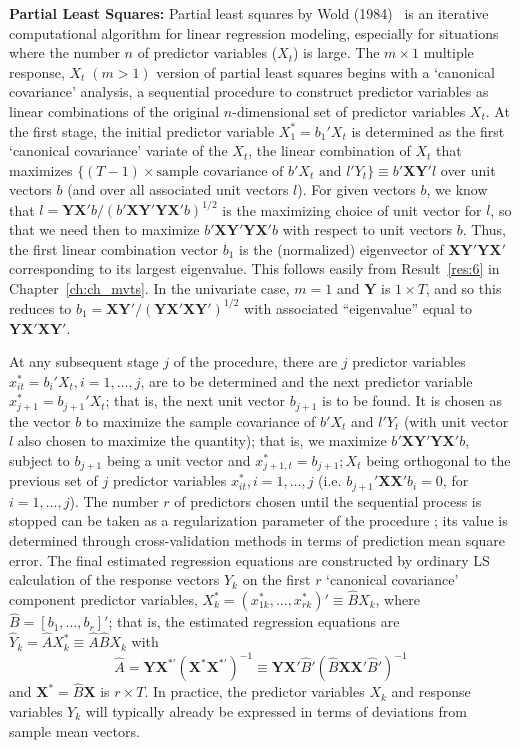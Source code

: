 \noindent\textbf{Partial Least Squares:} Partial least squares by Wold (1984)~\cite{wold} is an iterative computational algorithm for linear regression modeling, especially for situations where the number $n$ of predictor variables ($X_t$) is large. The $m \times 1$ multiple response, $X_t \;(m>1)$ version of partial least squares begins with a `canonical covariance' analysis, a sequential procedure to construct predictor variables as linear combinations of the original $n$-dimensional set of predictor variables $X_t$. At the first stage, the initial predictor variable $X_{1}^*=b_1'X_t$ is determined as the first `canonical covariance' variate of the $X_t$, the linear combination of $X_t$ that maximizes $\{(T - 1) \times \text{sample covariance of } b'X_t \text{ and } l'Y_t \} \equiv b' \mathbf{XY}' l$ over unit vectors $b$ (and over all associated unit vectors $l$). For given vectors $b$, we know that $l=\mathbf{YX'} b/(b' \mathbf{XY'YX'}b)^{1/2}$ is the maximizing choice of unit vector for $l$, so that we need then to maximize $b' \mathbf{XY'YX'}b$ with respect to unit vectors $b$. Thus, the first linear combination vector $b_1$ is the (normalized) eigenvector of $\mathbf{XY'YX'}$ corresponding to its largest eigenvalue. This follows easily from Result~\ref{res:6} in Chapter~\ref{ch:ch_mvts}. In the univariate case, $m=1$ and $\mathbf{Y}$ is $1 \times T$, and so this reduces to $b_1=\mathbf{XY'}/(\mathbf{YX'XY'})^{1/2}$ with associated ``eigenvalue'' equal to $\mathbf{YX'XY'}$.


At any subsequent stage $j$ of the procedure, there are $j$ predictor variables $x_{it}^*= b_i' X_t, i=1,\ldots, j$, are to be determined and the next predictor variable $x_{j+1}^*= b_{j+1}'X_t$; that is, the next unit vector $b_{j+1}$ is to be found. It is chosen as the vector $b$ to maximize the sample covariance of $b'X_t$ and $l' Y_t$ (with unit vector $l$ also chosen to maximize the quantity); that is, we maximize $b' \mathbf{XY'YX'}b$, subject to $b_{j+1}$ being a unit vector and $x_{j+1,t}^*=b_{j+1}; X_t$ being orthogonal to the previous set of $j$ predictor variables $x_{it}^*, i=1,\ldots,j$ (i.e. $b_{j+1}' \mathbf{XX'} b_i=0$, for $i=1,\ldots,j$). The number $r$ of predictors chosen until the sequential process is stopped can be taken as a regularization parameter of the procedure ; its value is determined through cross-validation methods in terms of prediction mean square error. The final estimated regression equations are constructed by ordinary LS calculation of the response vectors $Y_k$ on the first $r$ `canonical covariance' component predictor variables, $X_k^*= (x_{1k}^*,\ldots,x_{rk}^*)' \equiv \hat{B} X_k$, where $\hat{B}=[b_1,\ldots,b_r]'$; that is, the estimated regression equations are $\hat{Y}_k= \hat{A}X_k^* \equiv \hat{A}\hat{B} X_k$ with
	\[
	\hat{A}=\mathbf{YX}^{*'} (\mathbf{X}^* \mathbf{X}^{*'})^{-1} \equiv \mathbf{YX'} \hat{B}' (\hat{B} \mathbf{XX'} \hat{B}')^{-1}
	\]
and $\mathbf{X}^*=\hat{B}\mathbf{X}$ is $r \times T$. In practice, the predictor variables $X_k$ and response variables $Y_k$ will typically already be expressed in terms of deviations from sample mean vectors.


